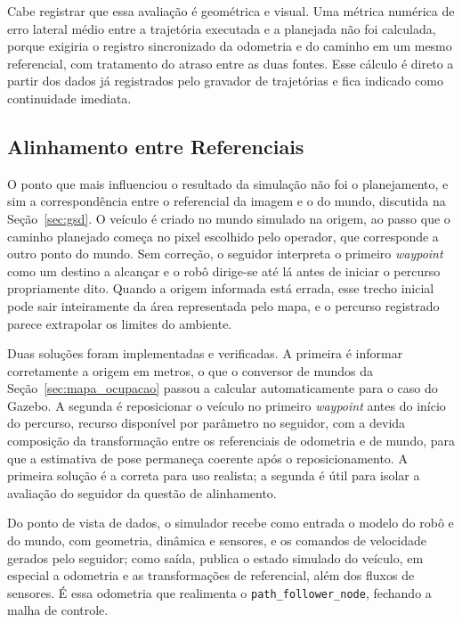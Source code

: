 \documentclass[
    12pt,
    openright,
    oneside,
    a4paper,
    english,
    brazil
]{abntex2}
\begin{document}
Cabe registrar que essa avaliação é geométrica e visual. Uma métrica numérica de erro lateral médio entre a trajetória executada e a planejada não foi calculada, porque exigiria o registro sincronizado da odometria e do caminho em um mesmo referencial, com tratamento do atraso entre as duas fontes. Esse cálculo é direto a partir dos dados já registrados pelo gravador de trajetórias e fica indicado como continuidade imediata.

\subsection{Alinhamento entre Referenciais}

O ponto que mais influenciou o resultado da simulação não foi o planejamento, e sim a correspondência entre o referencial da imagem e o do mundo, discutida na Seção~\ref{sec:gsd}. O veículo é criado no mundo simulado na origem, ao passo que o caminho planejado começa no pixel escolhido pelo operador, que corresponde a outro ponto do mundo. Sem correção, o seguidor interpreta o primeiro \textit{waypoint} como um destino a alcançar e o robô dirige-se até lá antes de iniciar o percurso propriamente dito. Quando a origem informada está errada, esse trecho inicial pode sair inteiramente da área representada pelo mapa, e o percurso registrado parece extrapolar os limites do ambiente.

Duas soluções foram implementadas e verificadas. A primeira é informar corretamente a origem em metros, o que o conversor de mundos da Seção~\ref{sec:mapa_ocupacao} passou a calcular automaticamente para o caso do Gazebo. A segunda é reposicionar o veículo no primeiro \textit{waypoint} antes do início do percurso, recurso disponível por parâmetro no seguidor, com a devida composição da transformação entre os referenciais de odometria e de mundo, para que a estimativa de pose permaneça coerente após o reposicionamento. A primeira solução é a correta para uso realista; a segunda é útil para isolar a avaliação do seguidor da questão de alinhamento.

Do ponto de vista de dados, o simulador recebe como entrada o modelo do robô e do mundo, com geometria, dinâmica e sensores, e os comandos de velocidade gerados pelo seguidor; como saída, publica o estado simulado do veículo, em especial a odometria e as transformações de referencial, além dos fluxos de sensores. É essa odometria que realimenta o \texttt{path\_follower\_node}, fechando a malha de controle.

\end{document}
